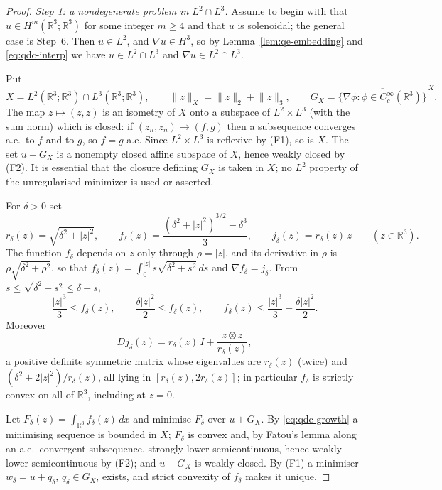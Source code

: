 \documentclass[11pt]{article}
\theoremstyle{definition}
\theoremstyle{plain}
\newcommand{\R}{\mathbb R}
\newcommand{\norm}[1]{\lVert #1\rVert}
\begin{document}
\begin{proof}
\emph{Step 1: a nondegenerate problem in $L^2\cap L^3$.}  Assume to begin with that
$u\in H^m(\R^3;\R^3)$ for some integer $m\ge4$ and that $u$ is solenoidal;
the general case is Step~6.  Then $u\in L^2$, and $\nabla u\in H^3$, so by
Lemma~\ref{lem:qe-embedding} and \eqref{eq:qdc-interp} we have
$u\in L^2\cap L^3$ and $\nabla u\in L^2\cap L^3$.

Put
\[
 X=L^2(\R^3;\R^3)\cap L^3(\R^3;\R^3),\qquad
 \norm z_X=\norm z_2+\norm z_3,
 \qquad
 G_X=\overline{\{\nabla\phi:\phi\in C_c^\infty(\R^3)\}}^{\,X}.
\]
The map $z\mapsto(z,z)$ is an isometry of $X$ onto a subspace of
$L^2\times L^3$ (with the sum norm) which is closed: if $(z_n,z_n)\to(f,g)$
then a subsequence converges a.e.\ to $f$ and to $g$, so $f=g$ a.e.  Since
$L^2\times L^3$ is reflexive by (F1), so is $X$.  The set $u+G_X$ is a
nonempty closed affine subspace of $X$, hence weakly closed by (F2).  It is
essential that the closure defining $G_X$ is taken in $X$; no $L^2$ property
of the unregularised minimizer is used or asserted.

For $\delta>0$ set
\begin{equation}\label{eq:qdc-regularizer}
 r_\delta(z)=\sqrt{\delta^2+|z|^2},\qquad
 f_\delta(z)=\frac{(\delta^2+|z|^2)^{3/2}-\delta^3}{3},\qquad
 j_\delta(z)=r_\delta(z)\,z\qquad(z\in\R^3).
\end{equation}
The function $f_\delta$ depends on $z$ only through $\rho=|z|$, and its
derivative in $\rho$ is $\rho\sqrt{\delta^2+\rho^2}$, so that
$f_\delta(z)=\int_0^{|z|}s\sqrt{\delta^2+s^2}\,ds$ and
$\nabla f_\delta=j_\delta$.  From $s\le\sqrt{\delta^2+s^2}\le\delta+s$,
\begin{equation}\label{eq:qdc-growth}
 \frac{|z|^3}3\le f_\delta(z),
 \qquad
 \frac{\delta|z|^2}2\le f_\delta(z),
 \qquad
 f_\delta(z)\le\frac{|z|^3}3+\frac{\delta|z|^2}2 .
\end{equation}
Moreover
\begin{equation}\label{eq:qdc-Dj}
 Dj_\delta(z)=r_\delta(z)\,I+\frac{z\otimes z}{r_\delta(z)},
\end{equation}
a positive definite symmetric matrix whose eigenvalues are $r_\delta(z)$
(twice) and $(\delta^2+2|z|^2)/r_\delta(z)$, all lying in
$[r_\delta(z),2r_\delta(z)]$; in particular $f_\delta$ is strictly convex on
all of $\R^3$, including at $z=0$.

Let $F_\delta(z)=\int_{\R^3}f_\delta(z)\,dx$ and minimise $F_\delta$ over
$u+G_X$.  By \eqref{eq:qdc-growth} a minimising sequence is bounded in
$X$; $F_\delta$ is convex and, by Fatou's lemma along an a.e.\ convergent
subsequence, strongly lower semicontinuous, hence weakly lower
semicontinuous by (F2); and $u+G_X$ is weakly closed.  By (F1) a minimiser
$w_\delta=u+q_\delta$, $q_\delta\in G_X$, exists, and strict convexity of
$f_\delta$ makes it unique.


\end{proof}
\end{document}
